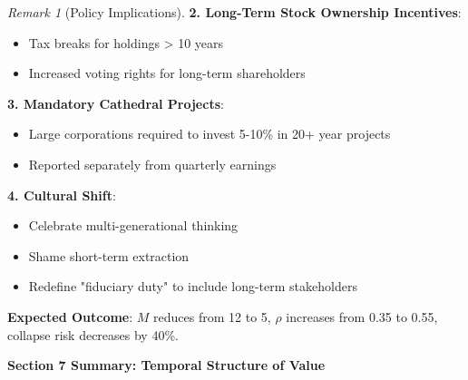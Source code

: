 \documentclass[11pt,a4paper]{article}
\theoremstyle{definition}
\theoremstyle{remark}
\newtheorem{remark}{Remark}[section]
\begin{document}
\begin{enumerate}
\begin{remark}[Policy Implications]
\textbf{2. Long-Term Stock Ownership Incentives}:
\begin{itemize}
    \item Tax breaks for holdings > 10 years
    \item Increased voting rights for long-term shareholders
\end{itemize}

\textbf{3. Mandatory Cathedral Projects}:
\begin{itemize}
    \item Large corporations required to invest 5-10\% in 20+ year projects
    \item Reported separately from quarterly earnings
\end{itemize}

\textbf{4. Cultural Shift}:
\begin{itemize}
    \item Celebrate multi-generational thinking
    \item Shame short-term extraction
    \item Redefine "fiduciary duty" to include long-term stakeholders
\end{itemize}

\textbf{Expected Outcome}: \(M\) reduces from 12 to 5, \(\rho\) increases from 0.35 to 0.55, collapse risk decreases by 40\%.
\end{remark}

\begin{mdframed}[backgroundcolor=green!10,linewidth=2pt,linecolor=green!70!black]
\textbf{Section 7 Summary: Temporal Structure of Value}


\end{mdframed}
\end{enumerate}
\end{document}
